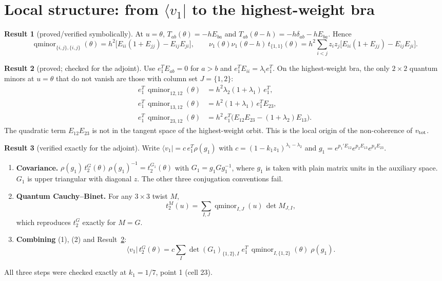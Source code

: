 \documentclass[11pt]{article}
\newcommand{\qmin}{\operatorname{qminor}}
\theoremstyle{definition}
\newtheorem{result}{Result}
\theoremstyle{remark}
\begin{document}
\section{Local structure: from $\langle v_1|$ to the highest-weight bra}\label{sec:local}

\begin{result}[proved/verified symbolically]
At $u=\theta$, $T_{ab}(\theta)=-hE_{ba}$ and $T_{ab}(\theta-h)=-h\delta_{ab}-hE_{ba}$. Hence
\begin{equation}
\qmin_{\{i,j\},\{i,j\}}(\theta)=h^2\big[E_{ii}(1+E_{jj})-E_{ij}E_{ji}\big],\qquad
\nu_1(\theta)\nu_1(\theta-h)\,t_{\{1,1\}}(\theta)=h^2\sum_{i<j}z_iz_j\big[E_{ii}(1+E_{jj})-E_{ij}E_{ji}\big].
\end{equation}
\end{result}

\begin{result}[proved; checked for the adjoint]\label{res:hw}
Use $e_1^TE_{ab}=0$ for $a>b$ and $e_1^TE_{ii}=\lambda_i e_1^T$. On the highest-weight bra, the only $2\times2$ quantum minors at $u=\theta$ that do not vanish are those with column set $J=\{1,2\}$:
\begin{align}
e_1^T\,\qmin_{12,12}(\theta)&=h^2\lambda_2(1+\lambda_1)\,e_1^T,\\
e_1^T\,\qmin_{13,12}(\theta)&=h^2(1+\lambda_1)\,e_1^TE_{23},\\
e_1^T\,\qmin_{23,12}(\theta)&=h^2\,e_1^T\big(E_{12}E_{23}-(1+\lambda_2)E_{13}\big).
\end{align}
The quadratic term $E_{12}E_{23}$ is not in the tangent space of the highest-weight orbit. This is the local origin of the non-coherence of $v_{\rm tot}$.
\end{result}

\begin{result}[verified exactly for the adjoint]\label{res:chain}
Write $\langle v_1|=c\,e_1^T\rho(g_1)$ with $c=(1-k_1z_1)^{\lambda_1-\lambda_2}$ and $g_1=e^{p_1'E_{12}}e^{p_2E_{13}}e^{p_3E_{23}}$.
\begin{enumerate}
\item \textbf{Covariance.} $\rho(g_1)\,t^G_2(\theta)\,\rho(g_1)^{-1}=t^{G_1}_2(\theta)$ with $G_1=g_1Gg_1^{-1}$, where $g_1$ is taken with plain matrix units in the auxiliary space. $G_1$ is upper triangular with diagonal $z$. The other three conjugation conventions fail.
\item \textbf{Quantum Cauchy--Binet.} For any $3\times3$ twist $M$,
\begin{equation}
t^M_2(u)=\sum_{I,J}\qmin_{I,J}(u)\,\det M_{J,I},
\end{equation}
which reproduces $t^G_2$ exactly for $M=G$.
\item \textbf{Combining} (1), (2) and Result~\ref{res:hw}:
\begin{equation}
\langle v_1|\,t^G_2(\theta)=c\sum_{I}\det(G_1)_{\{1,2\},I}\;e_1^T\,\qmin_{I,\{1,2\}}(\theta)\;\rho(g_1).
\end{equation}
\end{enumerate}
All three steps were checked exactly at $k_1=1/7$, point 1 (cell 23).
\end{result}
\end{document}
